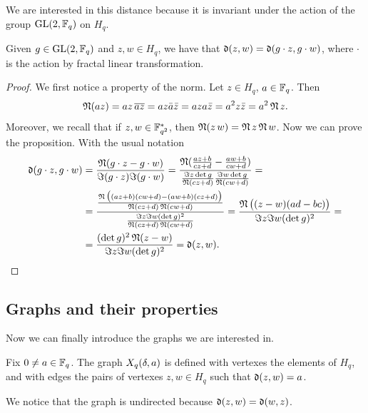 We are interested in this distance because it is invariant under the action of the group $\operatorname{GL}(2,{\mathbb F}_q)$ on $H_q$.
\begin{prop}
Given $g \in \operatorname{GL}(2,{\mathbb F}_q)$ and $z,w \in H_q$, we have that $\operatorname{\mathfrak{d}} (z,w)=\operatorname{\mathfrak{d}}(g \cdot z,g\cdot w)$,
where $\cdot$ is the action by fractal linear transformation.
\begin{proof}
We first notice a property of the norm. Let $z\in H_q$, $a\in {\mathbb F}_q$. Then
\begin{equation}\label{norm_prop}
\operatorname{\mathfrak{N}} (az) = az \, \overline{az} = az\bar{a}\bar{z}=aza\bar{z}=a^2 z \bar{z}=a^2 \operatorname{\mathfrak{N}} z.
\end{equation}
Moreover, we recall that if $z,w \in {\mathbb F}_{q^2}^{*}$, then $\operatorname{\mathfrak{N}} (z\,w)= \operatorname{\mathfrak{N}} z \operatorname{\mathfrak{N}} w$.
Now we can prove the proposition. With the usual notation
	\begin{align*}
	\operatorname{\mathfrak{d}} (g\cdot z,g\cdot w)&=\frac{\operatorname{\mathfrak{N}} (g\cdot z-g\cdot w)}{\Im (g\cdot z) \Im (g\cdot w)}
							  =\frac{\operatorname{\mathfrak{N}}(\frac{az+b}{cz+d} -
							   \frac{aw+b}{cw+d})}{\frac{\Im z \det g}{\operatorname{\mathfrak{N}} (cz+d)}\frac{\Im w \det g}{\operatorname{\mathfrak{N}} (cw+d)}}=\\
							  &=\frac{\frac{\operatorname{\mathfrak{N}}\big((az+b)(cw+d)-(aw+b)(cz+d)\big)}{\operatorname{\mathfrak{N}}(cz+d)\operatorname{\mathfrak{N}} (cw+d)}}
							  {\frac{\Im z \Im w (\det g)^2}{\operatorname{\mathfrak{N}} (cz+d)\operatorname{\mathfrak{N}} (cw+d)}}
							  =\frac{\operatorname{\mathfrak{N}} \big((z-w)(ad-bc)\big)}{\Im z \Im w (\det g)^2}=\\
							  &=\frac{(\det g)^2 \operatorname{\mathfrak{N}} (z-w)}{\Im z \Im w (\det g)^2}=\operatorname{\mathfrak{d}} (z,w).
	\end{align*}
\end{proof}
\end{prop}

\subsection{Graphs and their properties}
Now we can finally introduce the graphs we are interested in.
\begin{defn}
 Fix $0\neq a\in {\mathbb F}_q$. The graph $X_q (\delta ,a)$ is defined with vertexes the elements of $H_q$,
 and with edges the pairs of vertexes $z,w\in H_q$ such that $\operatorname{\mathfrak{d}} (z,w) = a$.
\end{defn}
\begin{rem}
We notice that the graph is undirected because $\operatorname{\mathfrak{d}} (z,w) = \operatorname{\mathfrak{d}} (w,z)$.
\end{rem}

